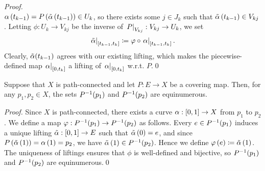 \documentclass[../Moduli_Spaces_of_Riemann_Surfaces.tex]{subfiles}
\begin{document}
\begin{proof}
{\begin{equation*}
            \end{equation*}
        } $\alpha\left(t_{k-1}\right)=P\left(\tilde{\alpha}\left(t_{k-1}\right)\right)\in U_k$, so there exists some $j\in J_k$ such that $\tilde{\alpha}\left(t_{k-1}\right)\in V_{kj}$. Letting $\phi:U_k\to V_{kj}$ be the inverse of $\left.P\right|_{V_{kj}}:V_{kj}\to U_k$, we set
        \begin{equation*}
            \left.\tilde{\alpha}\right|_{\left[t_{k-1},t_k\right]}\coloneqq\varphi\circ\left.\alpha\right|_{\left[t_{k-1},t_k\right]}.
        \end{equation*}
        Clearly, $\tilde{\alpha}\!\left(t_{k-1}\right)$ agrees with our existing lifting, which makes the piecewise-defined map $\left.\alpha\right|_{\left[0,t_k\right]}$ a lifting of $\left.\alpha\right|_{\left[0,t_k\right]}$ w.r.t. $P$.\qed
    \end{proof}
    \begin{corollary}\label{2.1:cor:fiber_cardinalities_coincide}
        Suppose that $X$ is path-connected and let $P:E\to X$ be a covering map. Then, for any $p_1,p_2\in X$, the sets $P^{-1}\!\left(p_1\right)$ and $P^{-1}\!\left(p_2\right)$ are equinumerous.
    \end{corollary}
    \begin{proof}
        Since $X$ is path-connected, there exists a curve $\alpha:\left[0,1\right]\to X$ from $p_1$ to $p_2$. We define a map $\varphi:P^{-1}\!\left(p_1\right)\to P^{-1}\!\left(p_2\right)$ as follows. Every $e\in P^{-1}\!\left(p_1\right)$ induces a unique lifting $\tilde{\alpha}:\left[0,1\right]\to E$ such that $\tilde{\alpha}\left(0\right)=e$, and since $P\left(\tilde{\alpha}\left(1\right)\right)=\alpha\left(1\right)=p_2$, we have $\tilde{\alpha}\left(1\right)\in P^{-1}\!\left(p_2\right)$. Hence we define $\varphi\left(e\right)\coloneqq\tilde{\alpha}\left(1\right)$. The uniqueness of liftings ensures that $\phi$ is well-defined and bijective, so $P^{-1}\!\left(p_1\right)$ and $P^{-1}\!\left(p_2\right)$ are equinumerous.\qed
    \end{proof}
\end{document}
